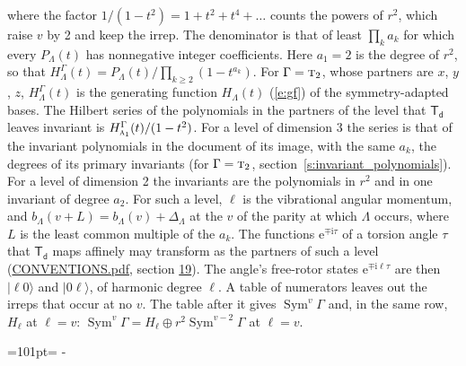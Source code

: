 \documentclass[10pt,a4paper]{article}
\newcommand{\needspace}[1]{\par\penalty-100\begingroup\dimen0=#1\relax\dimen2=\pagegoal
  \advance\dimen2-\pagetotal\ifdim\dimen0>\dimen2\relax\ifdim\dimen2>0pt\vfil\break\fi\fi
  \endgroup}
\numberwithin{equation}{section}
\newcommand{\grp}[1]{\mathsf{#1}}
\newcommand{\irr}[1]{\text{\normalfont\scshape #1}}
\newcommand{\iunit}{\mathrm{i}}
\newcommand{\expe}{\mathrm{e}}
\newcommand{\occ}[1]{\lvert #1\rangle}
\begin{document}
where the factor $1/(1 - t^2) = 1 + t^2 + t^4 + \dots$ counts the powers of $r^2$, which raise $v$ by 2 and keep the irrep. The denominator is that of least $\prod_k a_k$ for which every $P_\Lambda(t)$ has nonnegative integer coefficients. Here $a_1 = 2$ is the degree of $r^2$, so that $H^{\Gamma}_\Lambda(t) = P_\Lambda(t)/\prod_{k\ge2}(1 - t^{a_k})$. For $\Gamma = \irr{t}_{2}$, whose partners are $x$, $y$, $z$, $H^{\Gamma}_\Lambda(t)$ is the generating function $H_\Lambda(t)$ (\ref{e:gf}) of the symmetry-adapted bases. The Hilbert series of the polynomials in the partners of the level that $\grp{T_{d}}$ leaves invariant is $H^{\Gamma}_{\irr{a}_{1}}(t)/(1 - t^2)$. For a level of dimension 3 the series is that of the invariant polynomials in the document of its image, with the same $a_k$, the degrees of its primary invariants (for $\Gamma = \irr{t}_{2}$, section~\ref{s:invariant_polynomials}). For a level of dimension 2 the invariants are the polynomials in $r^2$ and in one invariant of degree $a_2$. \label{n:index.overtone.period}\label{n:index.increment.unitary}For such a level, $\ell$ is the vibrational angular momentum, and $b_\Lambda(v + L) = b_\Lambda(v) + \Delta_\Lambda$ at the $v$ of the parity at which $\Lambda$ occurs, where $L$ is the least common multiple of the $a_k$. \label{n:local.torsion.angle}The functions $\expe^{\mp\iunit\tau}$ of a torsion angle $\tau$ that $\grp{T_{d}}$ maps affinely may transform as the partners of such a level (\href{../../CONVENTIONS.pdf}{CONVENTIONS.pdf}, section \href{../../CONVENTIONS.pdf\#conv.19}{19}). The angle's free-rotor states $\expe^{\mp\iunit\ell\tau}$ are then $\occ{\ell 0}$ and $\occ{0 \ell}$, of harmonic degree $\ell$. A table of numerators leaves out the irreps that occur at no $v$. The table after it gives $\operatorname{Sym}^{v}\Gamma$ and, in the same row, $H_\ell$ at $\ell = v$: $\operatorname{Sym}^{v}\Gamma = H_\ell \oplus r^2\operatorname{Sym}^{v-2}\Gamma$ at $\ell = v$.
\needspace{101pt}
\end{document}
